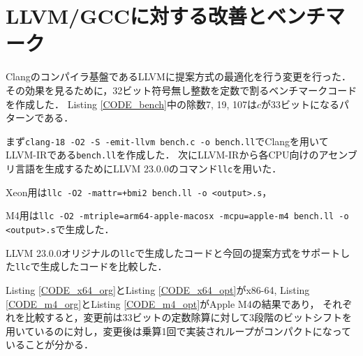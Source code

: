 \documentclass{jarticle}
\begin{document}




\section{LLVM/GCCに対する改善とベンチマーク}
Clangのコンパイラ基盤であるLLVMに提案方式の最適化を行う変更を行った\cite{LLVMopt}．
その効果を見るために，32ビット符号無し整数を定数で割るベンチマークコードを作成した．
Listing \ref{CODE_bench}中の除数7, 19, 107は$c$が33ビットになるパターンである．



まず\texttt{clang-18 -O2 -S -emit-llvm bench.c -o bench.ll}でClangを用いてLLVM-IRである\texttt{bench.ll}を作成した．
次にLLVM-IRから各CPU向けのアセンブリ言語を生成するためにLLVM 23.0.0のコマンド\texttt{llc}を用いた．

\noindent
Xeon用は\texttt{llc -O2 -mattr=+bmi2 bench.ll -o <output>.s}，

\noindent
M4用は\texttt{llc -O2 -mtriple=arm64-apple-macosx -mcpu=apple-m4 bench.ll -o <output>.s}で生成した．

LLVM 23.0.0オリジナルの\texttt{llc}で生成したコードと今回の提案方式をサポートした\texttt{llc}で生成したコードを比較した．





Listing \ref{CODE_x64_org}とListing \ref{CODE_x64_opt}がx86-64, Listing \ref{CODE_m4_org}とListing \ref{CODE_m4_opt}がApple M4の結果であり，
それぞれを比較すると，変更前は33ビットの定数除算に対して3段階のビットシフトを用いているのに対し，変更後は乗算1回で実装されループがコンパクトになっていることが分かる．
\end{document}
